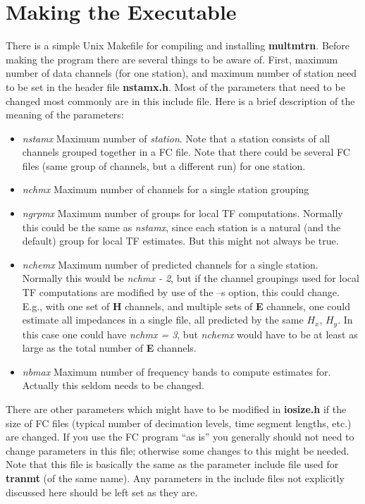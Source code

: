 \section{Making the Executable}

There is a simple Unix Makefile for compiling and installing {\bf multmtrn}.
Before making the program there are several things to be aware of.
First, maximum number of data channels (for one station), and maximum
number of station need to be set in the header file {\bf nstamx.h}.
Most of the parameters that need to be changed most commonly are in this
include file.  Here is a brief description of the meaning of the parameters:
\begin{itemize}

\item {\it nstamx} Maximum number of {\it station}.  Note that a station
consists of all channels grouped together in a FC file.  Note that there
could be several FC files (same group of channels, but a different run)
for one station.

\item {\it nchmx} Maximum number of channels for a single station grouping

\item {\it ngrpmx} Maximum number of groups for local TF computations.
Normally this could be the same as {\it nstamx}, since each station is
a natural (and the default) group for local TF estimates.  But
this might not always be true.

\item {\it nchemx} Maximum number of predicted channels for a single station.
Normally this would be {\it nchmx - 2}, but if the channel groupings used
for local TF computations are modified by use of the --s option, this
could change.  E.g., with one set of {\bf H} channels, and multiple sets of
{\bf E} channels, one could estimate all impedances in a single file,
all predicted by the same $H_x$, $H_y$.  In this case
one could have {\it nchmx = 3}, but {\it nchemx} would have to
be at least as large as the total number of {\bf E} channels.

\item {\it nbmax} Maximum number of frequency bands to compute estimates
for.  Actually this seldom needs to be changed.
\end{itemize}

There are other parameters which might have to be modified in {\bf iosize.h}
if the size of FC files (typical number of decimation levels, time
segment lengths, etc.) are changed.  If you use the FC program ``as is''
you generally should not need to change parameters in this file;
otherwise some changes to this might be needed.
Note that this file is basically the same as the parameter
include file used for {\bf tranmt} (of the same name).  
Any parameters in the include
files not explicitly discussed here should be left set as they are.

